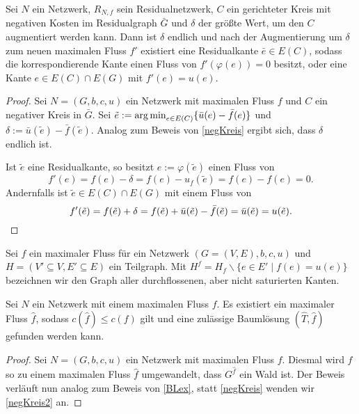\begin{lem}\label{negKreis2}Sei $N$ ein Netzwerk, $R_{N,f}$ sein Residualnetzwerk, $C$ ein gerichteter Kreis mit negativen Kosten im Residualgraph $\bar{G}$ und $\delta$ der größte Wert, um den $C$ augmentiert werden kann. Dann ist $\delta$ endlich und nach der Augmentierung um $\delta$ zum neuen maximalen Fluss $f'$ existiert eine Residualkante $\bar{e}\in E(C)$, sodass die korrespondierende Kante einen Fluss von $f'(\varphi(e))=0$ besitzt, oder eine Kante $e\in E(C)\cap E(G)$ mit $f'(e)=u(e)$.\end{lem}
\begin{proof}Sei $N=(G,b,c,u)$ ein Netzwerk mit maximalen Fluss $f$ und $C$ ein negativer Kreis in $\bar{G}$. Sei $\tilde{e}:=\operatorname*{arg\,min}_{e\in E(C)}\{\bar{u}(e)-\bar{f}(e)\}$ und $\delta:=\bar{u}(\tilde{e})-\bar{f}(\tilde{e})$. Analog zum Beweis von \cref{negKreis} ergibt sich, dass $\delta$ endlich ist.
	
Ist $\tilde{e}$ eine Residualkante, so besitzt $e:=\varphi(\tilde{e})$ einen Fluss von
\begin{equation*}
f'(e)=f(e)-\delta=f(e)-u_f(\tilde{e})=f(e)-f(e)=0.\end{equation*} Andernfalls ist $\tilde{e}\in E(C)\cap E(G)$ mit einem Fluss von
\begin{equation*}
f'(\tilde{e})=f(\tilde{e})+\delta=f(\tilde{e})+\bar{u}(\tilde{e})-\bar{f}(\tilde{e})=\bar{u}(\tilde{e})=u(\tilde{e}).\qedhere\end{equation*}\end{proof}

\begin{nota}Sei $f$ ein maximaler Fluss für ein Netzwerk $(G=(V,E),b,c,u)$ und $H=(V'\subseteq V, E'\subseteq E)$ ein Teilgraph. Mit $H^f=H_f\backslash\{e\in E'\mid f(e)=u(e)\}$ bezeichnen wir den Graph aller durchflossenen, aber nicht saturierten Kanten.\end{nota}

\begin{thm}\label{BLex2}Sei $N$ ein Netzwerk mit einem maximalen Fluss $f$. Es existiert ein maximaler Fluss $\hat{f}$, sodass $c(\hat{f})\leq c(f)$ gilt und eine zulässige Baumlösung $(\hat{T},\hat{f})$ gefunden werden kann.\end{thm}
\begin{proof}Sei $N=(G,b,c,u)$ ein Netzwerk mit maximalen Fluss $f$. Diesmal wird $f$ so zu einem maximalen Fluss $\hat{f}$ umgewandelt, dass $G^{\hat{f}}$ ein Wald ist. Der Beweis verläuft nun analog zum Beweis von \cref{BLex}, statt \cref{negKreis} wenden wir \cref{negKreis2} an.\end{proof}

